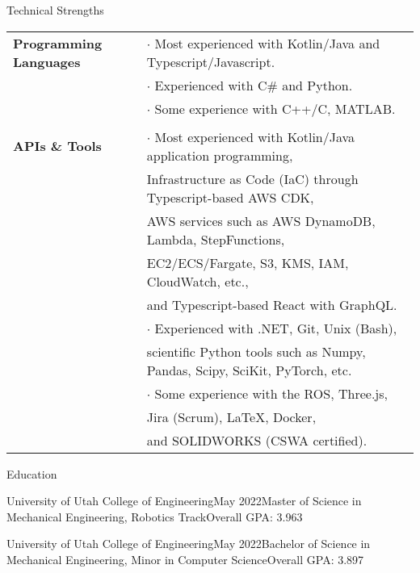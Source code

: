 \documentclass{resume}
\begin{document}
  \begin{rSection}{Technical Strengths}
    \begin{tabular}{ @{} >{\bfseries}l @{\hspace{3ex}} l }
      Programming Languages
      & $\cdot$ Most experienced with Kotlin/Java and Typescript/Javascript. \\
      & $\cdot$ Experienced with C\# and Python. \\
      & $\cdot$ Some experience with C++/C, MATLAB. \\

      & \\

      APIs \& Tools
      & $\cdot$ Most experienced with Kotlin/Java application programming, \\
      & \phantom{$\cdot$} Infrastructure as Code (IaC) through Typescript-based AWS CDK, \\
      & \phantom{$\cdot$} AWS services such as AWS DynamoDB, Lambda, StepFunctions, \\
      & \phantom{$\cdot$} EC2/ECS/Fargate, S3, KMS, IAM, CloudWatch, etc., \\
      & \phantom{$\cdot$} and Typescript-based React with GraphQL. \\
      & $\cdot$ Experienced with .NET, Git, Unix (Bash),  \\
      & \phantom{$\cdot$} scientific Python tools such as Numpy, Pandas, Scipy, SciKit, PyTorch, etc. \\
      & $\cdot$ Some experience with the ROS, Three.js, \\
      & \phantom{$\cdot$} Jira (Scrum), LaTeX, Docker,\\
      & \phantom{$\cdot$} and SOLIDWORKS (CSWA certified).\\
    \end{tabular}
  \end{rSection}

  \begin{rSection}{Education}

    \begin{rSubsection}{University of Utah College of Engineering}{May 2022}{Master of Science in Mechanical Engineering, Robotics Track}{Overall GPA: 3.963}
      \item[]
    \end{rSubsection}

    \vspace*{-7.5mm}

    \begin{rSubsection}{University of Utah College of Engineering}{May 2022}{Bachelor of Science in Mechanical Engineering, Minor in Computer Science}{Overall GPA: 3.897}
      \item[]
    \end{rSubsection}

    \vspace*{-7.5mm}

  \end{rSection}
\end{document}
